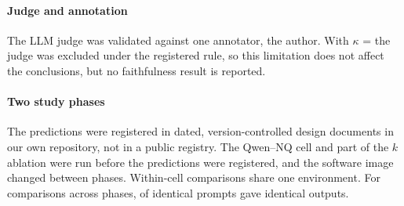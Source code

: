 \paragraph{Judge and annotation}
The LLM judge was validated against one annotator, the author. With $\kappa$ =  the judge was excluded under the registered rule, so this limitation does not affect the conclusions, but no faithfulness result is reported.

\paragraph{Two study phases}
The predictions were registered in dated, version-controlled design documents in our own repository, not in a public registry. The Qwen--NQ cell and part of the $k$ ablation were run before the predictions were registered, and the software image changed between phases. Within-cell comparisons share one environment. For comparisons across phases,  of  identical prompts gave identical outputs.
